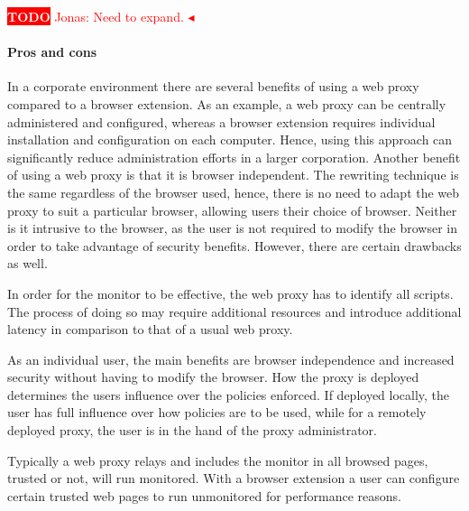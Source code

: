 \documentclass{llncs}
\newcommand{\todo}[1]{\colorbox{red}{\textcolor{white}{\sffamily\bfseries\scriptsize TODO}} \textcolor{red}{#1} \textcolor{red}{$\blacktriangleleft$}}
\begin{document}
\todo{Jonas: Need to expand.}

\paragraph{Pros and cons}

In a corporate environment there are several benefits of using a web proxy 
compared to a browser extension. As an example, a web proxy can be centrally 
administered and configured, whereas a browser extension requires individual installation 
and configuration on each computer. Hence, using this approach can significantly 
reduce administration efforts in a larger corporation. 
Another benefit of using a web proxy is that it is browser independent. The 
rewriting technique is the same regardless of the browser used, hence, there is no 
need to adapt the web proxy to suit a particular browser, allowing 
users their choice of browser.
Neither is it intrusive to the browser, as the user is not required to modify the 
browser in order to take advantage of security benefits. 
However, there 
are certain drawbacks as well. 

In order for the monitor to be effective, the web proxy 
has to identify all scripts. The process of doing so may require additional 
resources and introduce additional 
latency in comparison to that of a usual web proxy.

As an individual user, the main benefits are browser independence and  
increased security without having to modify the browser. How the proxy is 
deployed determines the users influence over 
the policies enforced. If deployed locally, the user has full influence over 
how policies are to be used, while for a remotely deployed proxy, the user is 
in the hand of the proxy administrator. 

Typically a web proxy relays and includes the monitor in all browsed pages, 
trusted or not, will run monitored. With a browser extension a user can
configure certain trusted web pages to run unmonitored for performance reasons.
\end{document}
